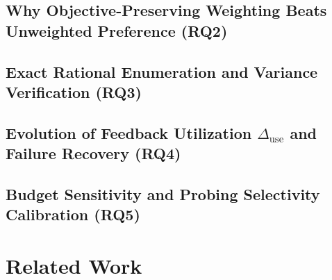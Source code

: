 \documentclass[11pt]{article}
\theoremstyle{definition}
\theoremstyle{remark}
\newcommand{\Duse}{\Delta_{\mathrm{use}}}
\begin{document}
\subsection{Why Objective-Preserving Weighting Beats Unweighted Preference (RQ2)}
\label{subsec:rq2_ablation}

\subsection{Exact Rational Enumeration and Variance Verification (RQ3)}
\label{subsec:rq3_exact}


\subsection{Evolution of Feedback Utilization $\Duse$ and Failure Recovery (RQ4)}
\label{subsec:rq4_duse}

\subsection{Budget Sensitivity and Probing Selectivity Calibration (RQ5)}
\label{subsec:rq5_budget}

\section{Related Work}
\label{sec:related}

\end{document}
